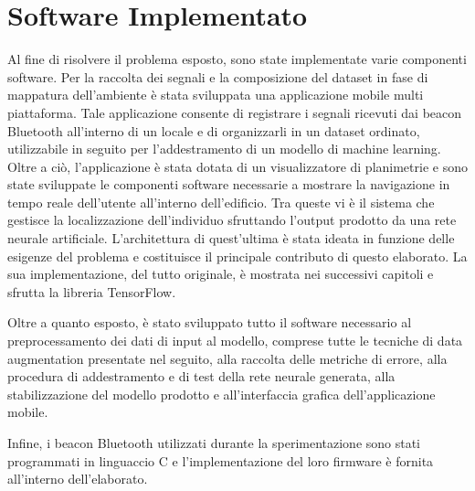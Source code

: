 \documentclass[draft]{standalone}
\begin{document}
\section{Software Implementato}
Al fine di risolvere il problema esposto, sono state implementate varie
componenti software. Per la raccolta dei segnali e la composizione del dataset
in fase di mappatura dell'ambiente è stata sviluppata una applicazione mobile
multi piattaforma. Tale applicazione consente di registrare i segnali ricevuti
dai beacon Bluetooth all'interno di un locale e di organizzarli in un dataset
ordinato, utilizzabile in seguito per l'addestramento di un modello di machine
learning. Oltre a ciò, l'applicazione è stata dotata di un visualizzatore di
planimetrie e sono state sviluppate le componenti software necessarie a
mostrare la navigazione in tempo reale dell'utente all'interno dell'edificio.
Tra queste vi è il sistema che gestisce la localizzazione dell'individuo
sfruttando l'output prodotto da una rete neurale artificiale. L'architettura
di quest'ultima è stata ideata in funzione delle esigenze del problema e
costituisce il principale contributo di questo elaborato. La sua
implementazione, del tutto originale, è mostrata nei successivi capitoli e
sfrutta la libreria TensorFlow.

Oltre a quanto esposto, è stato sviluppato tutto il software necessario al
preprocessamento dei dati di input al modello, comprese tutte le tecniche di
data augmentation presentate nel seguito, alla raccolta delle metriche di
errore, alla procedura di addestramento e di test della rete neurale generata,
alla stabilizzazione del modello prodotto e all'interfaccia grafica
dell'applicazione mobile.

Infine, i beacon Bluetooth utilizzati durante la sperimentazione sono stati
programmati in linguaccio C e l'implementazione del loro firmware è fornita
all'interno dell'elaborato.

\end{document}
